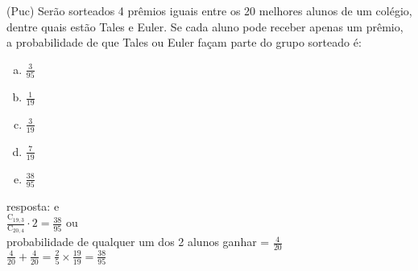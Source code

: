 \begin{ex}
 (Puc) Serão sorteados 4 prêmios iguais entre os 20 melhores alunos de um colégio, dentre quais estão Tales e Euler. Se cada aluno pode receber apenas um prêmio, a probabilidade de que Tales ou Euler façam parte do grupo sorteado é:
    \begin{enumerate}[(a)]
    \item $\frac{3}{95}$
    \item $\frac{1}{19}$
    \item $\frac{3}{19}$
    \item $\frac{7}{19}$
    \item $\frac{38}{95}$
    \end{enumerate}
      \begin{sol}
        resposta: e \\
        $\frac{\mathrm{C}_{{19},3}}{\mathrm{C}_{{20},4}}\cdot2=\frac{38}{95}$ ou\\
        probabilidade de qualquer um dos 2 alunos ganhar = $\frac{4}{20}$\\
        $\frac{4}{20}+\frac{4}{20}=\frac{2}{5 }\times \frac{19}{19}=\frac{38}{95}$
      \end{sol}
\end{ex}
